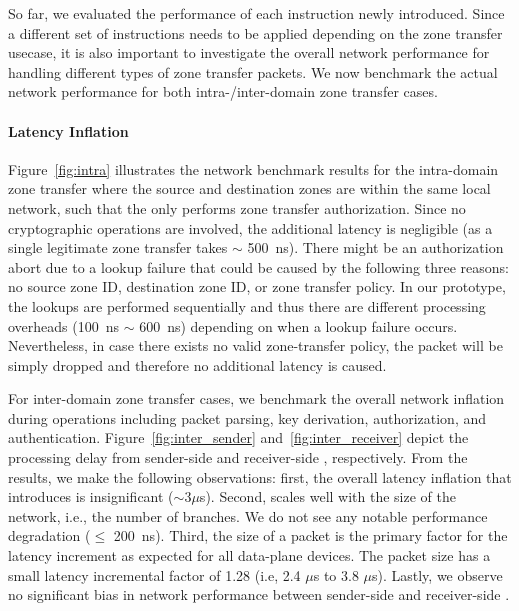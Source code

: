 So far, we evaluated the performance of each instruction newly introduced. Since a different 
set of instructions needs to be applied depending on the zone transfer usecase, it is also 
important to investigate the overall network performance for handling different types of zone 
transfer packets. We now benchmark the actual network performance for both intra-/inter-domain 
zone transfer cases.

\paragraph{Latency Inflation}
Figure~\ref{fig:intra} illustrates the network benchmark results for the intra-domain zone
transfer where the source and destination zones are within the same local network, such that
the \tp only performs zone transfer authorization. Since no cryptographic operations are involved,
the additional latency is negligible (as a single legitimate zone transfer takes $\sim$ 
\SI{500}{ns}). There might be an authorization abort due to a lookup failure that could be
caused by the following three reasons: no source zone ID, destination zone ID, or 
zone transfer policy. In our prototype, the lookups are performed sequentially and thus
there are different processing overheads (\SI{100}{ns} $\sim$ \SI{600}{ns}) depending on when a 
lookup failure occurs. Nevertheless, in case there exists no valid zone-transfer policy, the 
packet will be simply dropped and therefore no additional latency is caused. 

For inter-domain zone transfer cases, we benchmark the overall network inflation during \tp
operations including packet parsing, key derivation, authorization, and authentication. 
Figure~\ref{fig:inter_sender} and~\ref{fig:inter_receiver} depict the processing delay from
sender-side \tp and receiver-side \tp, respectively.
From the results, we make the following observations: first, the overall latency inflation that
\name introduces is insignificant ($\sim 3 \mu$s). Second, \name scales well with the size of the
network, i.e., the number of branches. We do not see any notable performance degradation 
($\leq$ \SI{200}{ns}). Third, the size of a packet is the primary factor for the latency increment
as expected for all data-plane devices. The packet size has a small latency incremental factor of 
1.28 (i.e, 2.4 $\mu$s to 3.8 $\mu$s). Lastly, we observe no significant bias in network 
performance between sender-side and receiver-side \tps.



